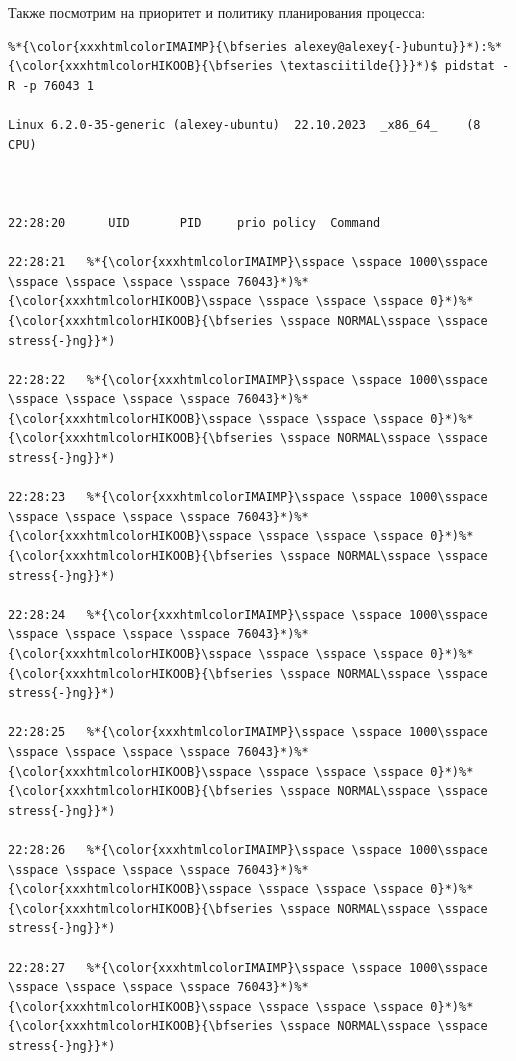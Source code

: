 Также посмотрим на приоритет и политику планирования процесса: \\
{\lstconsolestyle
{}
\begin{lstlisting}
%*{\color{xxxhtmlcolorIMAIMP}{\bfseries alexey@alexey{-}ubuntu}}*):%*{\color{xxxhtmlcolorHIKOOB}{\bfseries \textasciitilde{}}}*)$ pidstat -R -p 76043 1

Linux 6.2.0-35-generic (alexey-ubuntu) 	22.10.2023 	_x86_64_	(8 CPU)



22:28:20      UID       PID     prio policy  Command

22:28:21   %*{\color{xxxhtmlcolorIMAIMP}\sspace \sspace 1000\sspace \sspace \sspace \sspace \sspace 76043}*)%*{\color{xxxhtmlcolorHIKOOB}\sspace \sspace \sspace \sspace 0}*)%*{\color{xxxhtmlcolorHIKOOB}{\bfseries \sspace NORMAL\sspace \sspace stress{-}ng}}*)

22:28:22   %*{\color{xxxhtmlcolorIMAIMP}\sspace \sspace 1000\sspace \sspace \sspace \sspace \sspace 76043}*)%*{\color{xxxhtmlcolorHIKOOB}\sspace \sspace \sspace \sspace 0}*)%*{\color{xxxhtmlcolorHIKOOB}{\bfseries \sspace NORMAL\sspace \sspace stress{-}ng}}*)

22:28:23   %*{\color{xxxhtmlcolorIMAIMP}\sspace \sspace 1000\sspace \sspace \sspace \sspace \sspace 76043}*)%*{\color{xxxhtmlcolorHIKOOB}\sspace \sspace \sspace \sspace 0}*)%*{\color{xxxhtmlcolorHIKOOB}{\bfseries \sspace NORMAL\sspace \sspace stress{-}ng}}*)

22:28:24   %*{\color{xxxhtmlcolorIMAIMP}\sspace \sspace 1000\sspace \sspace \sspace \sspace \sspace 76043}*)%*{\color{xxxhtmlcolorHIKOOB}\sspace \sspace \sspace \sspace 0}*)%*{\color{xxxhtmlcolorHIKOOB}{\bfseries \sspace NORMAL\sspace \sspace stress{-}ng}}*)

22:28:25   %*{\color{xxxhtmlcolorIMAIMP}\sspace \sspace 1000\sspace \sspace \sspace \sspace \sspace 76043}*)%*{\color{xxxhtmlcolorHIKOOB}\sspace \sspace \sspace \sspace 0}*)%*{\color{xxxhtmlcolorHIKOOB}{\bfseries \sspace NORMAL\sspace \sspace stress{-}ng}}*)

22:28:26   %*{\color{xxxhtmlcolorIMAIMP}\sspace \sspace 1000\sspace \sspace \sspace \sspace \sspace 76043}*)%*{\color{xxxhtmlcolorHIKOOB}\sspace \sspace \sspace \sspace 0}*)%*{\color{xxxhtmlcolorHIKOOB}{\bfseries \sspace NORMAL\sspace \sspace stress{-}ng}}*)

22:28:27   %*{\color{xxxhtmlcolorIMAIMP}\sspace \sspace 1000\sspace \sspace \sspace \sspace \sspace 76043}*)%*{\color{xxxhtmlcolorHIKOOB}\sspace \sspace \sspace \sspace 0}*)%*{\color{xxxhtmlcolorHIKOOB}{\bfseries \sspace NORMAL\sspace \sspace stress{-}ng}}*)


\end{lstlisting}}
